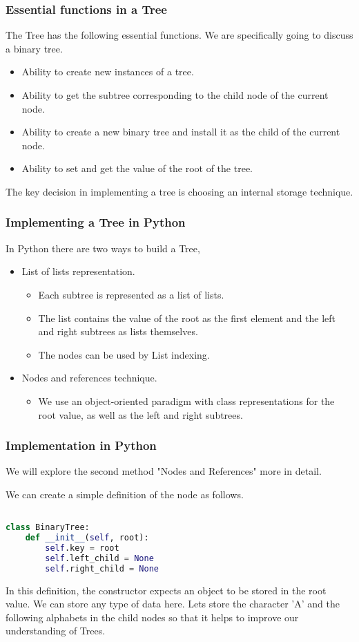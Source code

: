 \documentclass{beamer}
\begin{document}
\begin{frame}
\frametitle{Essential functions in a Tree}
The Tree has the following essential functions. We are specifically going to discuss a binary tree.
\begin{itemize}

\item Ability to create new instances of a tree.
\item Ability to get the subtree corresponding to the child node of the current node.
\item Ability to create a new binary tree and install it as the child of the current node.
\item Ability to set and get the value of the root of the tree.

\end{itemize}
The key decision in implementing a tree is choosing an internal storage technique.
\end{frame}

\begin{frame}
\frametitle{Implementing a Tree in Python}
In Python there are two ways to build a Tree,

\begin{itemize}
\item List of lists representation.
\begin{itemize}
\item Each subtree is represented as a list of lists.
\item The list contains the value of the root as the first element and the left and right subtrees as lists themselves.
\item The nodes can be used by List indexing.
\end{itemize}
\item Nodes and references technique.
\begin{itemize}
\item We use an object-oriented paradigm with 
class representations for the root value, as well as the left and right subtrees.
\end{itemize}
\end{itemize}
 
\end{frame}

\begin{frame}[fragile]
\frametitle{Implementation in Python}
We will explore the second method "Nodes and References" more in detail.

We can create a simple definition of the node as follows.
\begin{lstlisting}[language=Python, keywordstyle=\color{blue}]

class BinaryTree:
	def __init__(self, root):
		self.key = root
		self.left_child = None
		self.right_child = None

\end{lstlisting}
In this definition, the constructor expects an object to be stored in the root value. We can store any type of data here. Lets store the character 'A' and the following alphabets in the child nodes so that it helps to improve our understanding of Trees.
\end{frame}
\end{document}
